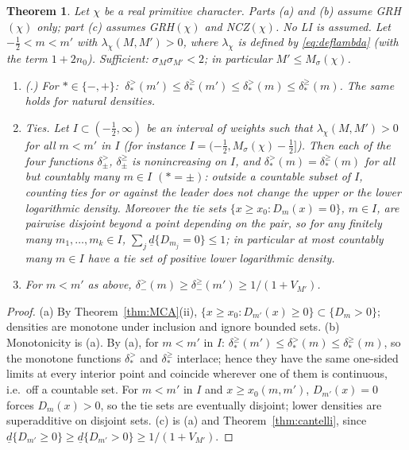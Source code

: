 \documentclass[11pt]{amsart}
\newtheorem{theorem}{Theorem}[section]
\theoremstyle{definition}
\numberwithin{equation}{section}
\newcommand{\dlow}{\underline{d}}
\begin{document}
\begin{theorem}\label{thm:ties}
Let $\chi$ be a real primitive character. Parts \textup{(a)} and
\textup{(b)} assume GRH$(\chi)$ only; part \textup{(c)} assumes
GRH$(\chi)$ and NCZ$(\chi)$. No LI is assumed. Let $-\tfrac12<m<m'$
with $\lambda_\chi(M,M')>0$, where $\lambda_\chi$ is defined by
\eqref{eq:deflambda} (with the term $1+2n_0$). Sufficient:
$\sigma_M\sigma_{M'}<2$; in particular $M'\le M_\sigma(\chi)$.
\begin{enumerate}
\item[(a)] (\cite[the corollary on densities without LI]{MC}.) For $*\in\{-,+\}$:
$\ \delta^{>}_{*}(m')\le\delta^{\ge}_{*}(m')\le\delta^{>}_{*}(m)
\le\delta^{\ge}_{*}(m)$. The same holds for natural densities.
\item[(b)] \emph{Ties.} Let $I\subset(-\tfrac12,\infty)$ be an
interval of weights such that $\lambda_\chi(M,M')>0$ for all
$m<m'$ in $I$ (for instance
$I=(-\tfrac12,M_\sigma(\chi)-\tfrac12]$). Then each of the four
functions $\delta^{>}_{\pm}$, $\delta^{\ge}_{\pm}$ is nonincreasing on
$I$, and $\delta^{>}_{*}(m)=\delta^{\ge}_{*}(m)$ for all but countably
many $m\in I$ $(*=\pm)$: outside a countable subset of $I$, counting
ties for or against the leader does not change the upper or the lower
logarithmic density. Moreover the tie sets
$\{x\ge x_0:D_m(x)=0\}$, $m\in I$, are pairwise disjoint beyond a
point depending on the pair, so for any finitely many
$m_1,\dots,m_k\in I$, $\sum_j\dlow\{D_{m_j}=0\}\le1$; in particular
at most countably many $m\in I$ have a tie set of positive lower
logarithmic density.
\item[(c)] For $m<m'$ as above,
$\delta^{>}_{-}(m)\ge\delta^{\ge}_{-}(m')\ge1/(1+V_{M'})$.
\end{enumerate}
\end{theorem}

\begin{proof}
(a) By Theorem~\ref{thm:MCA}(ii),
$\{x\ge x_0:D_{m'}(x)\ge0\}\subset\{D_m>0\}$; densities are monotone
under inclusion and ignore bounded sets. (b) Monotonicity is (a). By
(a), for $m<m'$ in $I$:
$\delta^{\ge}_{*}(m')\le\delta^{>}_{*}(m)\le\delta^{\ge}_{*}(m)$, so
the monotone functions $\delta^{>}_{*}$ and $\delta^{\ge}_{*}$
interlace; hence they have the same one-sided limits at every
interior point and coincide wherever one of them is continuous, i.e.\
off a countable set. For $m<m'$ in $I$ and $x\ge x_0(m,m')$,
$D_{m'}(x)=0$ forces $D_m(x)>0$, so the tie sets are eventually
disjoint; lower densities are superadditive on disjoint sets. (c) is
(a) and Theorem~\ref{thm:cantelli}, since
$\dlow\{D_{m'}\ge0\}\ge\dlow\{D_{m'}>0\}\ge1/(1+V_{M'})$.
\end{proof}
\end{document}
